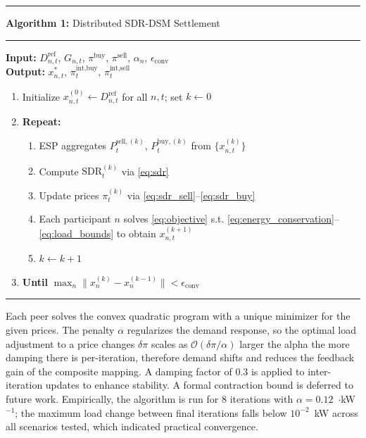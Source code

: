 \documentclass[conference]{IEEEtran}
\newcommand{\rupee}{\text{Rs.}}
\begin{document}
\vspace{4pt}
\hrule\vspace{4pt}
\noindent\textbf{Algorithm 1:} Distributed SDR-DSM Settlement\\
\vspace{2pt}\hrule\vspace{4pt}
\noindent\textbf{Input:} $D_{n,t}^{\text{ref}}$, $G_{n,t}$, $\pi^{\text{buy}}$, $\pi^{\text{sell}}$, $\alpha_n$, $\epsilon_{\text{conv}}$\\
\textbf{Output:} $x_{n,t}^{*}$, $\pi_t^{\text{int,buy}}$, $\pi_t^{\text{int,sell}}$
\begin{enumerate}
    \item Initialize $x_{n,t}^{(0)} \leftarrow D_{n,t}^{\text{ref}}$ for all $n, t$; set $k \leftarrow 0$
    \item \textbf{Repeat:}
    \begin{enumerate}
        \item[(a)] ESP aggregates $P_t^{\text{sell},(k)}$, $P_t^{\text{buy},(k)}$ from $\{x_{n,t}^{(k)}\}$
        \item[(b)] Compute $\text{SDR}_t^{(k)}$ via \eqref{eq:sdr}
        \item[(c)] Update prices $\pi_t^{(k)}$ via \eqref{eq:sdr_sell}--\eqref{eq:sdr_buy}
        \item[(d)] Each participant $n$ solves \eqref{eq:objective} s.t. \eqref{eq:energy_conservation}--\eqref{eq:load_bounds} to obtain $x_{n,t}^{(k+1)}$
        \item[(e)] $k \leftarrow k + 1$
    \end{enumerate}
    \item \textbf{Until} $\max_n \|x_n^{(k)} - x_n^{(k-1)}\| < \epsilon_{\text{conv}}$
\end{enumerate}
\vspace{2pt}\hrule
\vspace{4pt}

Each peer solves the convex quadratic program with a unique minimizer for the given prices. The penalty $\alpha$ regularizes the demand response, so the optimal load adjustment to a price changes  $\delta\pi$ scales as $\mathcal{O}(\delta\pi / \alpha)$ larger the alpha the more damping there is per-iteration, therefore demand shifts and reduces the feedback gain of the composite mapping. A damping factor of 0.3 is applied to inter-iteration updates to enhance stability. A formal contraction bound is deferred to future work. Empirically, the algorithm is run for 8 iterations with $\alpha = 0.12$~\rupee$\cdot$kW$^{-1}$; the maximum load change between final iterations falls below $10^{-2}$~kW across all scenarios tested, which indicated practical convergence.
\end{document}
